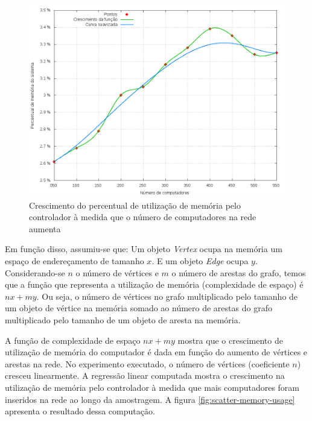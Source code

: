 \break
\begin{figure}[!htb]
    \centering
    \label{fig:memory-usage-growth}
    \includegraphics[width=\linewidth]{img/memory-usage-growth}
    \caption{Crescimento do percentual de utilização de memória pelo
    controlador à medida que o número de computadores na rede aumenta}
\end{figure}

Em função disso, assumiu-se que: Um objeto \emph{Vertex} ocupa na memória um 
espaço de endereçamento de tamanho $x$. 
E um objeto \emph{Edge} ocupa $y$.
Considerando-se $n$ o número de vértices e $m$ o número de arestas do grafo,
temos que a função que representa a utilização de memória (complexidade de 
espaço) é $nx + my$.
Ou seja, o número de vértices no grafo multiplicado pelo tamanho de um 
objeto de vértice na memória somado ao número de arestas do grafo 
multiplicado pelo tamanho de um objeto de aresta na memória.


A função de complexidade de espaço $nx + my$ mostra que o crescimento de 
utilização de memória do computador é dada em função do aumento de vértices
e arestas na rede.
No experimento executado, o número de vértices (coeficiente $n$) cresceu 
linearmente.
A regressão linear computada mostra o crescimento na utilização de memória 
pelo controlador à medida que mais computadores foram inseridos na rede ao 
longo da amostragem.
A figura \ref{fig:scatter-memory-usage} apresenta o resultado dessa 
computação.

